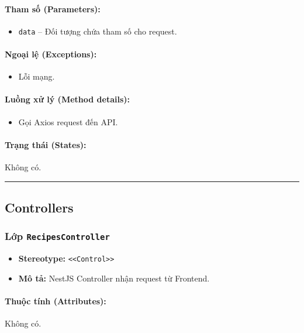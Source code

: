 \documentclass[12pt,a4paper]{article}
\begin{document}
\paragraph{Tham số (Parameters):}
\begin{itemize}[leftmargin=*]
    \item \texttt{data} – Đối tượng chứa tham số cho request.
\end{itemize}


\paragraph{Ngoại lệ (Exceptions):}
\begin{itemize}[leftmargin=*]
    \item Lỗi mạng.
\end{itemize}


\paragraph{Luồng xử lý (Method details):}
\begin{itemize}[leftmargin=*]
    \item Gọi Axios request đến API.
\end{itemize}


\paragraph{Trạng thái (States):}
Không có.

\vskip 0.5cm
\noindent\rule{\textwidth}{0.5pt}
\vskip 0.5cm

\subsection{Controllers}

\subsubsection{Lớp \texttt{RecipesController}}
\begin{itemize}[leftmargin=*]
    \item \textbf{Stereotype:} \texttt{\textless{}\textless{}Control\textgreater{}\textgreater{}}
    \item \textbf{Mô tả:} NestJS Controller nhận request từ Frontend.
\end{itemize}

\paragraph{Thuộc tính (Attributes):}
Không có.
\end{document}
